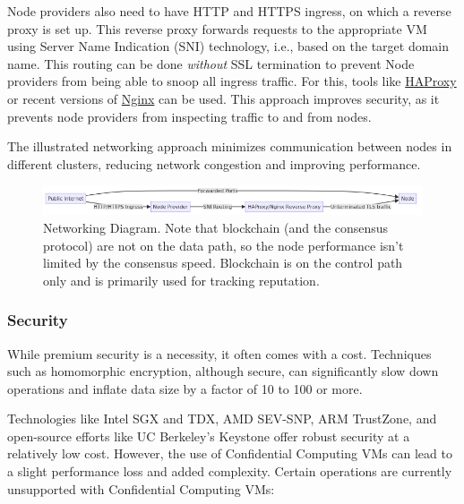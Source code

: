 Node providers also need to have HTTP and HTTPS ingress, on which a reverse proxy is set up. This reverse proxy forwards requests to the appropriate VM using Server Name Indication (SNI) technology, i.e., based on the target domain name. This routing can be done {\em without} SSL termination to prevent Node providers from being able to snoop all ingress traffic. For this, tools like \href{https://www.haproxy.com/blog/enhanced-ssl-load-balancing-with-server-name-indication-sni-tls-extension}{HAProxy} or recent versions of \href{https://nginx.org/en/docs/stream/ngx_stream_ssl_preread_module.html}{Nginx} can be used. This approach improves security, as it prevents node providers from inspecting traffic to and from nodes.

The illustrated networking approach minimizes communication between nodes in different clusters, reducing network congestion and improving performance.

\begin{figure}[ht]
    \centering
    \includegraphics[width=\textwidth]{figures/impl-networking.png}
    \caption{Networking Diagram. Note that blockchain (and the consensus protocol) are not on the data path, so the node performance isn't limited by the consensus speed. Blockchain is on the control path only and is primarily used for tracking reputation.}
    \label{fig:networking_diagram}
\end{figure}


\subsubsection{Security}

While premium security is a necessity, it often comes with a cost. Techniques such as homomorphic encryption, although secure, can significantly slow down operations and inflate data size by a factor of 10 to 100 or more.

Technologies like Intel SGX and TDX, AMD SEV-SNP, ARM TrustZone, and open-source efforts like UC Berkeley's Keystone offer robust security at a relatively low cost. However, the use of Confidential Computing VMs can lead to a slight performance loss and added complexity. Certain operations are currently unsupported with Confidential Computing VMs:


